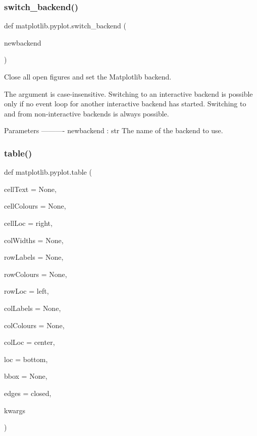\subsubsection{\texorpdfstring{switch\+\_\+backend()}{switch\_backend()}}
{\footnotesize\ttfamily def matplotlib.\+pyplot.\+switch\+\_\+backend (\begin{DoxyParamCaption}\item[{}]{newbackend }\end{DoxyParamCaption})}

\begin{DoxyVerb}Close all open figures and set the Matplotlib backend.

The argument is case-insensitive.  Switching to an interactive backend is
possible only if no event loop for another interactive backend has started.
Switching to and from non-interactive backends is always possible.

Parameters
----------
newbackend : str
    The name of the backend to use.
\end{DoxyVerb}
 \mbox{\label{namespacematplotlib_1_1pyplot_a21de0572325a3d9ac97579dec3aea9d5}} 
\subsubsection{\texorpdfstring{table()}{table()}}
{\footnotesize\ttfamily def matplotlib.\+pyplot.\+table (\begin{DoxyParamCaption}\item[{}]{cell\+Text = {\ttfamily None},  }\item[{}]{cell\+Colours = {\ttfamily None},  }\item[{}]{cell\+Loc = {\ttfamily \textquotesingle{}right\textquotesingle{}},  }\item[{}]{col\+Widths = {\ttfamily None},  }\item[{}]{row\+Labels = {\ttfamily None},  }\item[{}]{row\+Colours = {\ttfamily None},  }\item[{}]{row\+Loc = {\ttfamily \textquotesingle{}left\textquotesingle{}},  }\item[{}]{col\+Labels = {\ttfamily None},  }\item[{}]{col\+Colours = {\ttfamily None},  }\item[{}]{col\+Loc = {\ttfamily \textquotesingle{}center\textquotesingle{}},  }\item[{}]{loc = {\ttfamily \textquotesingle{}bottom\textquotesingle{}},  }\item[{}]{bbox = {\ttfamily None},  }\item[{}]{edges = {\ttfamily \textquotesingle{}closed\textquotesingle{}},  }\item[{}]{kwargs }\end{DoxyParamCaption})}

